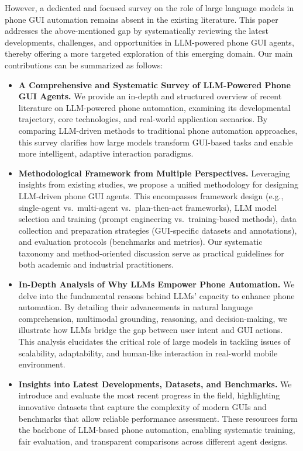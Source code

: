 However, a dedicated and focused survey on the role of large language models in phone GUI automation remains absent in the existing literature. This paper addresses the above-mentioned gap by systematically reviewing the latest developments, challenges, and opportunities in LLM-powered phone GUI agents, thereby offering a more targeted exploration of this emerging domain. Our main contributions can be summarized as follows:

\begin{itemize}
    \item \textbf{A Comprehensive and Systematic Survey of LLM-Powered Phone GUI Agents.} 
    We provide an in-depth and structured overview of recent literature on LLM-powered phone automation, examining its developmental trajectory, core technologies, and real-world application scenarios. By comparing LLM-driven methods to traditional phone automation approaches, this survey clarifies how large models transform GUI-based tasks and enable more intelligent, adaptive interaction paradigms.

    \item \textbf{Methodological Framework from Multiple Perspectives.} 
    Leveraging insights from existing studies, we propose a unified methodology for designing LLM-driven phone GUI agents. This encompasses framework design (e.g., single-agent vs.\ multi-agent vs.\ plan-then-act frameworks), LLM model selection and training (prompt engineering vs.\ training-based methods), data collection and preparation strategies (GUI-specific datasets and annotations), and evaluation protocols (benchmarks and metrics). Our systematic taxonomy and method-oriented discussion serve as practical guidelines for both academic and industrial practitioners.

    \item \textbf{In-Depth Analysis of Why LLMs Empower Phone Automation.}
    We delve into the fundamental reasons behind LLMs' capacity to enhance phone automation. By detailing their advancements in natural language comprehension, multimodal grounding, reasoning, and decision-making, we illustrate how LLMs bridge the gap between user intent and GUI actions. This analysis elucidates the critical role of large models in tackling issues of scalability, adaptability, and human-like interaction in real-world mobile environment.

    \item \textbf{Insights into Latest Developments, Datasets, and Benchmarks.}
    We introduce and evaluate the most recent progress in the field, highlighting innovative datasets that capture the complexity of modern GUIs and benchmarks that allow reliable performance assessment. These resources form the backbone of LLM-based phone automation, enabling systematic training, fair evaluation, and transparent comparisons across different agent designs.


\end{itemize}
